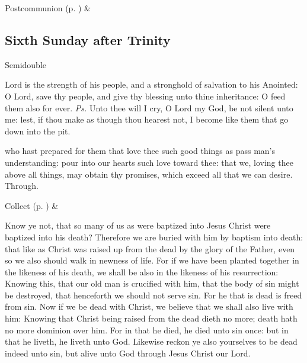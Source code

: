 \begin{rubric}
     Postcommunion  (p. \pageref{SPSaints}) \&  
\end{rubric}


\clearpage
\subsection{Sixth Sunday after Trinity}
\begin{inhead}
    {Semidouble}
\end{inhead}


\introit
{} Lord is the strength of his people, and a stronghold of salvation to his Anointed: O Lord, save thy people, and give thy blessing unto thine inheritance: O feed them also for ever. \textit{Ps.} Unto thee will I cry, O Lord my God, be not silent unto me: lest, if thou make as though thou hearest not, I become like them that go down into the pit.

\collect
{} who hast prepared for them that love thee such good things as pass man's understanding: pour into our hearts such love toward thee: that we, loving thee above all things, may obtain thy promises, which exceed all that we can desire. Through.
\begin{rubric}
     Collect  (p. \pageref{SPSaints}) \&  
\end{rubric}

 Know ye not, that so many of us as were baptized into Jesus Christ were baptized into his death? Therefore we are buried with him by baptism into death: that like as Christ was raised up from the dead by the glory of the Father, even so we also should walk in newness of life. For if we have been planted together in the likeness of his death, we shall be also in the likeness of his resurrection: Knowing this, that our old man is crucified with him, that the body of sin might be destroyed, that henceforth we should not serve sin. For he that is dead is freed from sin. Now if we be dead with Christ, we believe that we shall also live with him: Knowing that Christ being raised from the dead dieth no more; death hath no more dominion over him. For in that he died, he died unto sin once: but in that he liveth, he liveth unto God. Likewise reckon ye also yourselves to be dead indeed unto sin, but alive unto God through Jesus Christ our Lord.

